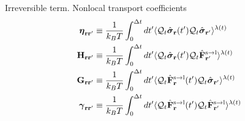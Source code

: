 \documentclass{beamer}
\begin{document}
\begin{frame}{Irreversible term. Nonlocal transport coefficients}
\begin{align}
  \boldsymbol{\eta}_{{\bf  r}{\bf r}'} &\equiv
\frac{1}{k_BT}\int_0^{\Delta t} dt'\langle 
{\cal Q}_t\hat{\boldsymbol{\sigma}}_{{\bf r}}(t')
{\cal Q}_t\hat{\boldsymbol{\sigma}}_{{\bf r}'}\rangle^{\lambda(t)}
\nonumber\\
{\bf H}_{{\bf r}{\bf r}'}&\equiv\frac{1}{k_BT}\int_0^{\Delta t} dt'
\langle {\cal Q}_t\hat{\boldsymbol{\sigma}}_{{\bf r}}(t')
{\cal Q}_t\hat{\bf F}^{\rm s\to l}_{{\bf r}'}\rangle^{\lambda(t)}
\nonumber\\
{\bf G}_{{\bf r}{\bf r}'}&\equiv\frac{1}{k_BT}\int_0^{\Delta t} dt'
\langle {\cal Q}_t\hat{\bf F}^{\rm s\to l}_{{\bf r}}(t')
{\cal Q}_t\hat{\boldsymbol{\sigma}}_{{\bf r}'}\rangle^{\lambda(t)}
\nonumber\\
\boldsymbol{\gamma}_{{\bf  r}{\bf r}'}&\equiv\frac{1}{k_BT}\int_0^{\Delta t} dt'
\langle 
{\cal Q}_t\hat{\bf F}^{\rm s\to l}_{{\bf r}}(t')
{\cal Q}_t\hat{\bf F}^{\rm s\to l}_{{\bf r}'}\rangle^{\lambda(t)}
\nonumber
\end{align}
\end{frame}
\end{document}
